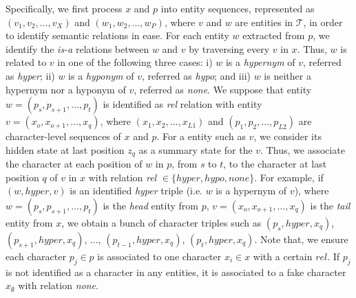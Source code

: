 Specifically, we first process $x$ and $p$ into entity sequences, represented as 
$(v_1, v_2, ..., v_X)$ and $(w_1, w_2, ..., w_P)$, where $v$ and $w$
are entities in $\mathcal{T}$,  in order to identify semantic relations in ease.
For each entity $w$ extracted from $p$, 
we identify the \emph{is-a} relations 
between $w$ and $v$ by traversing every $v$ in $x$.
Thus, $w$ is related to $v$ in one of the following three cases:
 i) $w$ is a \emph{hypernym} of $v$, referred as \emph{hyper};
 ii) $w$ is a \emph{hyponym} of $v$, referred as \emph{hypo};
 and iii) $w$ is neither a hypernym nor a hyponym of $v$, referred as \emph{none}.
We suppose that entity $w=(p_s, p_{s+1}, ..., p_{t})$ is identified as \emph{rel} relation with 
entity $v = (x_o, x_{o+1}, ..., x_{q})$,
where $(x_1, x_2, ..., x_{L1})$ and $(p_1, p_2, ..., p_{L2})$ are
character-level sequences of $x$ and $p$.
For a entity such as $v$, we consider its hidden state at last position $z_q$
as a summary state for the $v$.
Thus, we associate the character at each position of $w$ in $p$, from $s$ to $t$,  to 
the character at last position $q$ of $v$ in $x$ with relation \emph{rel}
$\in \{hyper, hypo, none\}$.
For example, if $(w, hyper, v)$ is an identified \emph{hyper} triple 
(i.e. $w$ is a hypernym of $v$), 
where $w=(p_s, p_{s+1}, ..., p_{t})$ is the \emph{head} entity from $p$, 
$v = (x_o, x_{o+1}, ..., x_{q})$ is the \emph{tail} entity from $x$,
we obtain a bunch of character triples such as $(p_s, hyper, x_q)$, 
$(p_{s+1}, hyper, x_q)$, ..., $(p_{t-1}, hyper, x_q)$, $(p_{t}, hyper, x_q)$.
Note that, we ensure each character $p_j \in p$ is associated to one 
character $x_i \in x$ with a certain $rel$. 
If $p_j$ is not identified as a character in any entities, 
it is associated to a fake character $x_{\emptyset}$ with relation \emph{none}.





